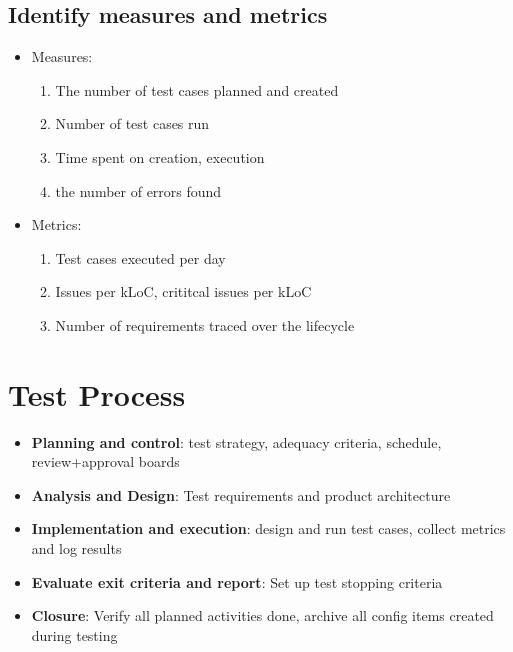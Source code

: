 \documentclass{article}
\begin{document}
\subsection{Identify measures and metrics}
\begin{itemize}
    \item Measures:
    \begin{enumerate}
        \item The number of test cases planned and created
        \item Number of test cases run
        \item Time spent on creation, execution
        \item the number of errors found 
    \end{enumerate}
    
    \item Metrics:
    \begin{enumerate}
        \item Test cases executed per day
        
        \item Issues per kLoC, crititcal issues per kLoC
        
        \item Number of requirements traced over the lifecycle
    \end{enumerate}
\end{itemize}

\section{Test Process}
\begin{itemize}
    \item \textbf{Planning and control}: test strategy, adequacy criteria, schedule, review+approval boards
    \item \textbf{Analysis and Design}: Test requirements and product architecture
    \item \textbf{Implementation and execution}: design and run test cases, collect metrics and log results
    \item \textbf{Evaluate exit criteria and report}: Set up test stopping criteria 
    \item \textbf{Closure}: Verify all planned activities done, archive all config items created during testing
\end{itemize}
\end{document}
